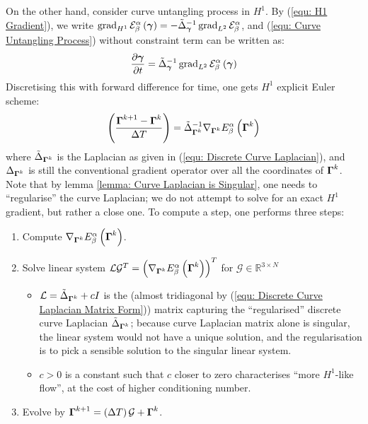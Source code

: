 \documentclass[../dissertation.tex]{subfiles}
\begin{document}
On the other hand, consider curve untangling process in $H^1$.
By (\ref{equ: H1 Gradient}), we write $\operatorname{grad}_{H^1} \mathcal{E}_{\beta}^{\alpha} \left( \boldsymbol{\gamma} \right) = - \tilde{\Delta}_{\boldsymbol{\gamma}}^{-1} \operatorname{grad}_{L^2} \mathcal{E}_{\beta}^{\alpha}$,
and
(\ref{equ: Curve Untangling Process}) without constraint term can be written as:
\begin{equation}
    \frac{\partial \boldsymbol{\gamma}}{\partial t} = \tilde{\Delta}_{\boldsymbol{\gamma}}^{-1} \operatorname{grad}_{L^2} \mathcal{E}_{\beta}^{\alpha} \left( \boldsymbol{\gamma} \right)
\end{equation}
Discretising this with forward difference for time, one gets $H^1$ explicit Euler scheme:
\begin{equation}
    \left( \frac{\boldsymbol{\Gamma}^{k+1} - \boldsymbol{\Gamma}^k}{\Delta T} \right) = \tilde{\Delta}_{\boldsymbol{\Gamma}^k}^{-1} \nabla_{\boldsymbol{\Gamma}^k} E_{\beta}^{\alpha} \left( \boldsymbol{\Gamma}^k \right)
\end{equation}
where $\tilde{\Delta}_{\boldsymbol{\Gamma}^k}$ is the Laplacian as given in (\ref{equ: Discrete Curve Laplacian}),
and $\Delta_{\boldsymbol{\Gamma}^k}$ is still the conventional gradient operator over all the coordinates of $\boldsymbol{\Gamma}^k$.
Note that by lemma \ref{lemma: Curve Laplacian is Singular}, one needs to ``regularise'' the curve Laplacian;
we do not attempt to solve for an exact $H^1$ gradient, but rather a close one.
To compute a step, one performs three steps:
\begin{enumerate}
    \item Compute $\nabla_{\boldsymbol{\Gamma}^k} E_{\beta}^{\alpha} \left( \boldsymbol{\Gamma}^k \right)$.
    \item Solve linear system $\mathcal{L} \mathcal{G}^{T} = \left( \nabla_{\boldsymbol{\Gamma}^k} E_{\beta}^{\alpha} \left( \boldsymbol{\Gamma}^k \right) \right)^T$ for $\mathcal{G} \in \mathbb{R}^{3 \times N}$
        \begin{itemize}
            \item $\mathcal{L} = \tilde{\Delta}_{\boldsymbol{\Gamma}^k} + cI$ is the (almost tridiagonal by (\ref{equ: Discrete Curve Laplacian Matrix Form})) matrix capturing the ``regularised'' discrete curve Laplacian $\tilde{\Delta}_{\boldsymbol{\Gamma}^k}$;
                because curve Laplacian matrix alone is singular, the linear system would not have a unique solution,
                and the regularisation is to pick a sensible solution to the singular linear system.
            \item $c > 0$ is a constant such that $c$ closer to zero characterises ``more $H^1$-like flow'', at the cost of higher conditioning number.
        \end{itemize}
    \item Evolve by $\boldsymbol{\Gamma}^{k+1} = \left( \Delta T \right) \mathcal{G} + \boldsymbol{\Gamma}^k$.
\end{enumerate}
\end{document}
